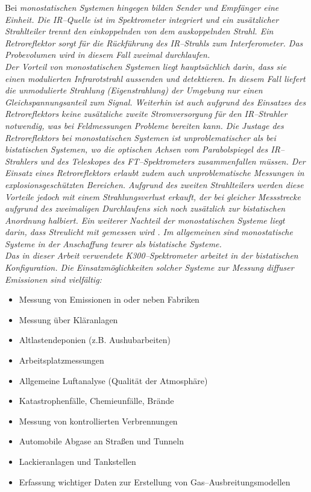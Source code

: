Bei \it monostatischen Systemen \rm hingegen bilden Sender und
Empfänger eine Einheit. Die IR--Quelle ist im Spektrometer
integriert und ein zusätzlicher Strahlteiler trennt den
einkoppelnden von dem auskoppelnden Strahl. Ein Retroreflektor
sorgt für die Rückführung des IR--Strahls zum Interferometer. Das
Probevolumen wird in diesem Fall zweimal durchlaufen.\\

Der Vorteil von monostatischen Systemen liegt hauptsächlich darin,
dass sie einen modulierten Infrarotstrahl aussenden und
detektieren. In diesem Fall liefert die unmodulierte Strahlung
(Eigenstrahlung) der Umgebung nur einen Gleichspannungsanteil zum
Signal. Weiterhin ist auch aufgrund des Einsatzes des
Retroreflektors keine zusätzliche zweite Stromversorgung für den
IR--Strahler notwendig, was bei Feldmessungen Probleme bereiten
kann. Die Justage des Retroreflektors bei monostatischen Systemen
ist unproblematischer als bei bistatischen Systemen, wo die
optischen Achsen vom Parabolspiegel des IR--Strahlers und des
Teleskopes des FT--Spektrometers zusammenfallen müssen. Der
Einsatz eines Retroreflektors erlaubt zudem auch unproblematische
Messungen in explosionsgeschützten Bereichen. Aufgrund des zweiten
Strahlteilers werden diese Vorteile jedoch mit einem
Strahlungsverlust erkauft, der bei gleicher Messstrecke aufgrund
des zweimaligen Durchlaufens sich noch zusätzlich zur bistatischen
Anordnung halbiert. Ein weiterer Nachteil der monostatischen
Systeme liegt darin, dass Streulicht mit gemessen wird
\cite{richardson298}. Im allgemeinen sind monostatische Systeme in
der Anschaffung teurer als bistatische Systeme.\\

Das in dieser Arbeit verwendete K300--Spektrometer arbeitet in der
bistatischen Konfiguration. Die Einsatzmöglichkeiten solcher
Systeme zur Messung diffuser Emissionen sind vielfältig:
\begin{itemize}
  \item Messung von Emissionen in oder neben Fabriken
  \item Messung über Kläranlagen
  \item Altlastendeponien (z.B. Aushubarbeiten)
  \item Arbeitsplatzmessungen
  \item Allgemeine Luftanalyse (Qualität der Atmosphäre)
  \item Katastrophenfälle, Chemieunfälle, Brände
  \item Messung von kontrollierten Verbrennungen
  \item Automobile Abgase an Stra{\ss}en und Tunneln
  \item Lackieranlagen und Tankstellen
  \item Erfassung wichtiger Daten zur Erstellung von
  Gas--Ausbreitungsmodellen
\end{itemize}

